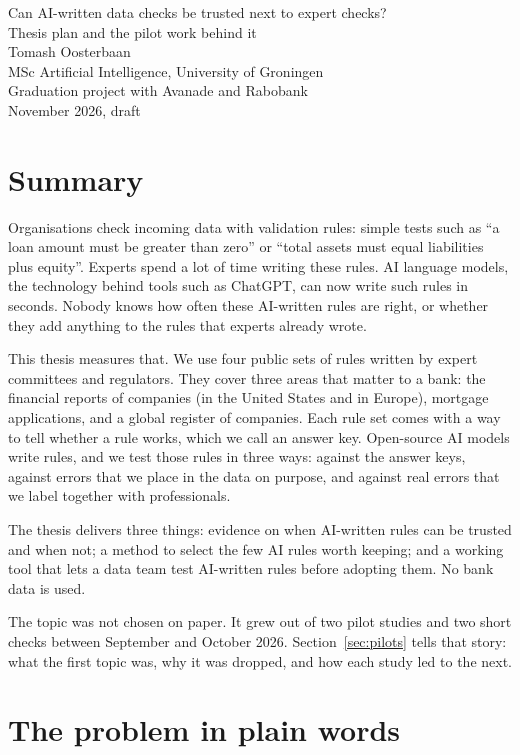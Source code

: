 \documentclass[11pt,a4paper]{article}
\begin{document}
\begin{center}
{\Large Can AI-written data checks be trusted next to expert checks?}\\[0.4em]
{\large Thesis plan and the pilot work behind it}\\[0.8em]
Tomash Oosterbaan\\
MSc Artificial Intelligence, University of Groningen\\
Graduation project with Avanade and Rabobank\\
November 2026, draft
\end{center}

\section{Summary}

Organisations check incoming data with validation rules: simple tests such as ``a loan amount must be greater than zero'' or ``total assets must equal liabilities plus equity''. Experts spend a lot of time writing these rules. AI language models, the technology behind tools such as ChatGPT, can now write such rules in seconds. Nobody knows how often these AI-written rules are right, or whether they add anything to the rules that experts already wrote.

This thesis measures that. We use four public sets of rules written by expert committees and regulators. They cover three areas that matter to a bank: the financial reports of companies (in the United States and in Europe), mortgage applications, and a global register of companies. Each rule set comes with a way to tell whether a rule works, which we call an answer key. Open-source AI models write rules, and we test those rules in three ways: against the answer keys, against errors that we place in the data on purpose, and against real errors that we label together with professionals.

The thesis delivers three things: evidence on when AI-written rules can be trusted and when not; a method to select the few AI rules worth keeping; and a working tool that lets a data team test AI-written rules before adopting them. No bank data is used.

The topic was not chosen on paper. It grew out of two pilot studies and two short checks between September and October 2026. Section~\ref{sec:pilots} tells that story: what the first topic was, why it was dropped, and how each study led to the next.

\section{The problem in plain words}
\end{document}
